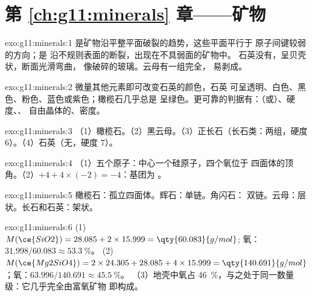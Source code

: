 \section*{第 \ref{ch:g11:minerals} 章——矿物}

\begin{solution}{exo:g11:minerals:1}
是矿物沿平整平面破裂的趋势，这些平面平行于
原子间键较弱的方向；是
沿不规则表面的断裂，出现在不具弱面的矿物中。
石英没有，呈贝壳状，断面光滑弯曲，
像破碎的玻璃。云母有一组完全，
易剥成。
\end{solution}

\begin{solution}{exo:g11:minerals:2}
微量其他元素即可改变石英的颜色，石英
可呈透明、白色、黑色、粉色、蓝色或紫色；橄榄石几乎总是
呈绿色。更可靠的判据有：（或）、硬度、、
自由晶体的、密度。
\end{solution}

\begin{solution}{exo:g11:minerals:3}
（1）橄榄石。（2）黑云母。（3）正长石（长石类：两组，硬度
6）。（4）石英（无，硬度 7）。
\end{solution}

\begin{solution}{exo:g11:minerals:4}
（1）五个原子：中心一个硅原子，四个氧位于
四面体的顶角。（2）$+4 + 4 \times (-2) = -4$：基团为 。
\end{solution}

\begin{solution}{exo:g11:minerals:5}
橄榄石：孤立四面体。辉石：单链。角闪石：
双链。云母：层状。长石和石英：架状。
\end{solution}

\begin{solution}{exo:g11:minerals:6}
(1) $M(\ce{SiO2}) = 28.085 + 2 \times 15.999 = \qty{60.083}{g/mol}$;
氧：$31.998/60.083 \approx \qty{53.3}{\percent}$。
(2) $M(\ce{Mg2SiO4}) = 2 \times 24.305 + 28.085 + 4 \times 15.999 =
\qty{140.691}{g/mol}$；氧：$63.996/140.691 \approx \qty{45.5}{\percent}$。
（3）地壳中氧占 \qty{46}{\percent}，与之处于同一数量级：它几乎完全由富氧矿物
即构成。
\end{solution}

